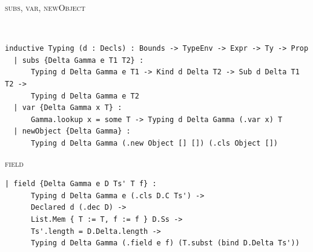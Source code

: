 \begin{cmp}{\textsc{subs}, \textsc{var}, \textsc{newObject}}
\begin{paperside}
\\[1ex]
\qquad
\fit{$\inferrule{ }{
  \typing{\Delta}{\Gamma}{\obj{\Object}{}{}}{\gen{\Object}{}}
}$}
\end{paperside}
\begin{leanside}
\begin{lstlisting}[style=leanside]
inductive Typing (d : Decls) : Bounds -> TypeEnv -> Expr -> Ty -> Prop
  | subs {Delta Gamma e T1 T2} :
      Typing d Delta Gamma e T1 -> Kind d Delta T2 -> Sub d Delta T1 T2 ->
      Typing d Delta Gamma e T2
  | var {Delta Gamma x T} :
      Gamma.lookup x = some T -> Typing d Delta Gamma (.var x) T
  | newObject {Delta Gamma} :
      Typing d Delta Gamma (.new Object [] []) (.cls Object [])
\end{lstlisting}
\end{leanside}
\end{cmp}

\begin{cmp}{\textsc{field}}
\begin{paperside}
\end{paperside}
\begin{leanside}
\begin{lstlisting}[style=leanside]
  | field {Delta Gamma e D Ts' T f} :
      Typing d Delta Gamma e (.cls D.C Ts') ->
      Declared d (.dec D) ->
      List.Mem { T := T, f := f } D.Ss ->
      Ts'.length = D.Delta.length ->
      Typing d Delta Gamma (.field e f) (T.subst (bind D.Delta Ts'))
\end{lstlisting}
\end{leanside}
\end{cmp}

